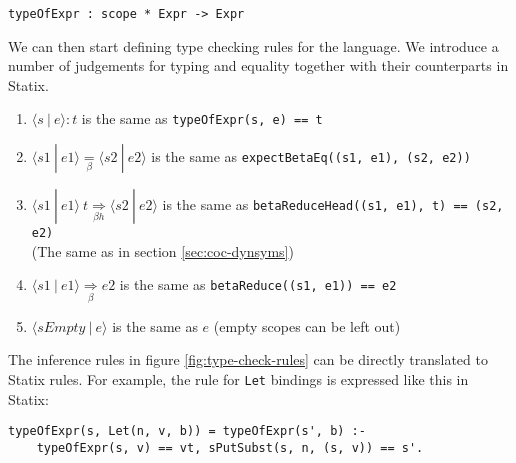 \documentclass[a4paper,UKenglish,cleveref, autoref, thm-restate]{oasics-v2021}
\newcommand{\scope}[2]{\langle#1 \: | \: #2\rangle}
\newcommand{\bhr}[3]{ #1 \: #2 \underset{\beta h}{\Rightarrow} #3 }
\newcommand{\toe}[3]{ \scope{#1}{#2} : #3 }
\newcommand{\bred}[3]{ \scope{#1}{#2} \underset{\beta}{\Rightarrow} #3 }
\newcommand{\beq}[2]{ #1 \underset{\beta}{=} #2 }
\begin{document}
\begin{lstlisting}
typeOfExpr : scope * Expr -> Expr
\end{lstlisting}
We can then start defining type checking rules for the language. We introduce a number of judgements for typing and equality together with their counterparts in Statix.
\begin{enumerate}
	\item $\toe{s}{e}{t}$ is the same as \verb|typeOfExpr(s, e) == t|
	\item $\beq{\scope{s1}{e1}}{\scope{s2}{e2}}$ is the same as \verb|expectBetaEq((s1, e1), (s2, e2))|
	\item $\bhr{\scope{s1}{e1}}{t}{\scope{s2}{e2}}$ is the same as \verb|betaReduceHead((s1, e1), t) == (s2, e2)| \\ (The same as in section \ref{sec:coc-dynsyms})
	\item $\bred{s1}{e1}{e2}$ is the same as \verb|betaReduce((s1, e1)) == e2|
	\item $\scope{sEmpty}{e}$ is the same as $e$ (empty scopes can be left out)
\end{enumerate}

The inference rules in figure \ref{fig:type-check-rules} can be directly translated to Statix rules. For example, the rule for \verb|Let| bindings is expressed like this in Statix:
\begin{lstlisting}
typeOfExpr(s, Let(n, v, b)) = typeOfExpr(s', b) :-
    typeOfExpr(s, v) == vt, sPutSubst(s, n, (s, v)) == s'.
\end{lstlisting}
\end{document}
